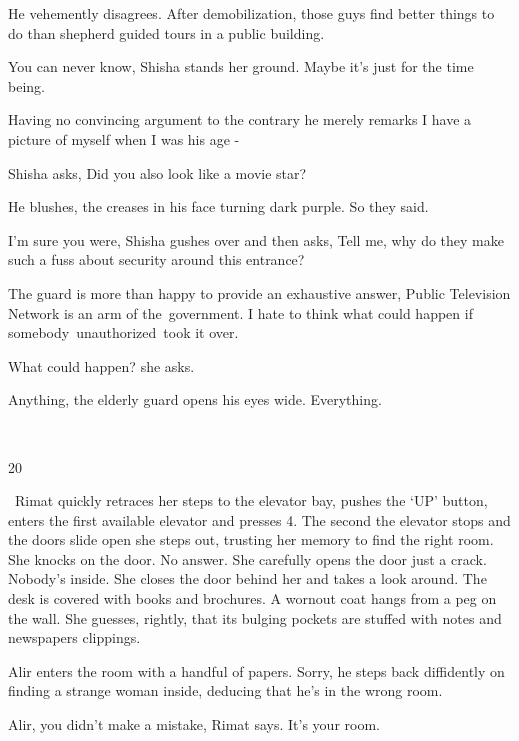 \documentclass[letterpaper]{article}
\begin{document}
He vehemently disagrees. {\textquotedbl}After demobilization, those guys find better things to do than shepherd guided
tours in a public building.{\textquotedbl} 

{\textquotedbl}You can never know,{\textquotedbl} Shisha stands her ground. {\textquotedbl}Maybe it's just for the time
being.{\textquotedbl} 

Having no convincing argument to the contrary he merely remarks {\textquotedbl}I have a picture of myself when I was his
age -{\textquotedbl} \ 

Shisha asks, {\textquotedbl}Did you also look like a movie star?{\textquotedbl} 

He blushes, the creases in his face turning dark purple. {\textquotedbl}So they said.{\textquotedbl}~ 

{\textquotedbl}I'm sure you were,{\textquotedbl} Shisha gushes over and then asks, {\textquotedbl}Tell me, why do they
make such a fuss about security around this entrance?{\textquotedbl} 

The guard is more than happy to provide an exhaustive answer, {\textquotedbl}Public Television Network is an arm of
the~government. I hate to think what could happen if somebody~unauthorized~took it over.{\textquotedbl} 

{\textquotedbl}What could happen?{\textquotedbl} she asks.

{\textquotedbl}Anything,{\textquotedbl} the elderly guard opens his eyes wide. {\textquotedbl}Everything.{\textquotedbl}

~

20~

~Rimat quickly retraces her steps to the elevator bay, pushes the `UP' button, enters the first available elevator and
presses 4. The second the elevator stops and the doors slide open she steps out, trusting her memory to find the right
room. She knocks on the door. No answer. She carefully opens the door just a crack. Nobody's inside. She closes the
door behind her and takes a look around. The desk is covered with books and brochures. A wornout coat hangs from a peg
on the wall. She guesses, rightly, that its bulging pockets are stuffed with notes and{ }newspapers
clippings. 

Alir enters the room with a handful of papers. {\textquotedbl}Sorry,{\textquotedbl} he steps back diffidently on finding
a strange woman inside, deducing that he's in the wrong room. 

{\textquotedbl}Alir, you didn't make a mistake,{\textquotedbl} Rimat says. {\textquotedbl}It's your room.{\textquotedbl}
\end{document}
